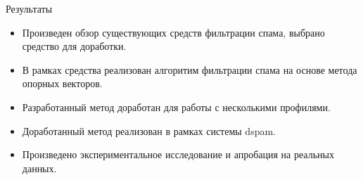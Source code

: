 \documentclass{beamer}
\begin{document}
\begin{frame}{Результаты}
\begin{itemize}
\item Произведен обзор существующих средств фильтрации спама, выбрано средство для доработки.
\item В рамках средства реализован алгоритим фильтрации спама на основе метода опорных векторов.
\item Разработанный метод доработан для работы с несколькими профилями.
\item Доработанный метод реализован в рамках системы dspam.
\item Произведено экспериментальное исследование и апробация на реальных данных.
\end{itemize}
\end{frame}
\end{document}
